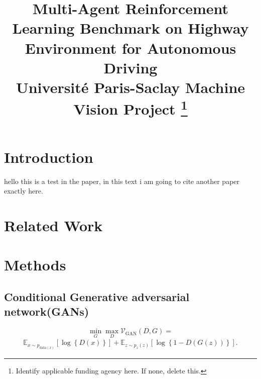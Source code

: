 \documentclass[conference]{IEEEtran}
\begin{document}
\title{Multi-Agent Reinforcement Learning Benchmark on Highway Environment for Autonomous Driving\\
{\footnotesize Université Paris-Saclay Machine Vision Project}
\thanks{Identify applicable funding agency here. If none, delete this.}
}

\author{
}

\maketitle

\begin{abstract}

\end{abstract}

\begin{IEEEkeywords}

\end{IEEEkeywords}

\section{Introduction}
hello this is a test in the paper\cite{DBLP:journals/corr/ZhuPIE17}, in this text i am going
to cite another paper exactly here\cite{https://doi.org/10.48550/arxiv.1411.1784}. 

\section{Related Work}


\section{Methods}

\subsection{Conditional Generative adversarial network(GANs)}%


\begin{equation}
\min_{G}\max_{D}\mathcal V_{\text{GAN}}\left(D, G \right) = \end{equation}
\begin{align*}
 \mathbb E_{x \sim p_{\text{data}\left( x\right) }}\left[ \log \left\{ D\left( x \right) \right\} \right] + \mathbb E_{z\sim p_{z}\left( z\right)}\left[ \log\left\{ 1 - D\left( G\left( z\right) \right) \right\}\right].   
\end{align*}
\end{document}
